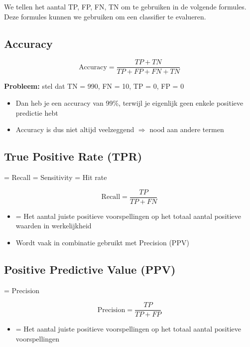 \documentclass{article}
\begin{document}
We tellen het aantal TP, FP, FN, TN om te gebruiken in de volgende formules. 
Deze formules kunnen we gebruiken om een classifier te evalueren.

\subsection{Accuracy}

\begin{equation}
    \text{Accuracy} = \frac{TP + TN}{TP + FP + FN + TN}
\end{equation}

\textbf{Probleem:} stel dat TN = 990, FN = 10, TP = 0, FP = 0

\begin{itemize}
    \item Dan heb je een accuracy van 99\%, terwijl je eigenlijk geen enkele positieve predictie hebt
    \item Accuracy is dus niet altijd veelzeggend $\Rightarrow$ nood aan andere termen
\end{itemize}

\subsection{True Positive Rate (TPR)}

= Recall = Sensitivity = Hit rate

\begin{equation}
    \text{Recall} = \frac{TP}{TP + FN}
\end{equation}

\begin{itemize}
    \item = Het aantal juiste positieve voorspellingen op het totaal aantal positieve waarden in werkelijkheid
    \item Wordt vaak in combinatie gebruikt met Precision (PPV)
\end{itemize}


\subsection{Positive Predictive Value (PPV)}

= Precision

\begin{equation}
    \text{Precision} = \frac{TP}{TP + FP}
\end{equation}

\begin{itemize}
    \item = Het aantal juiste positieve voorspellingen op het totaal aantal positieve voorspellingen
\end{itemize}
\end{document}
